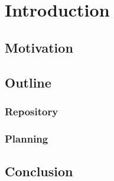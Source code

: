 \chapter{Introduction}
\label{introduction}

\lipsum[1]

\section{Motivation}

\lipsum[2]

\section{Outline}

\lipsum[2-5]

\subsection{Repository}

\lipsum[6-10]

\subsection{Planning}

\lipsum[10-14]


\section*{Conclusion}

\lipsum[15]
